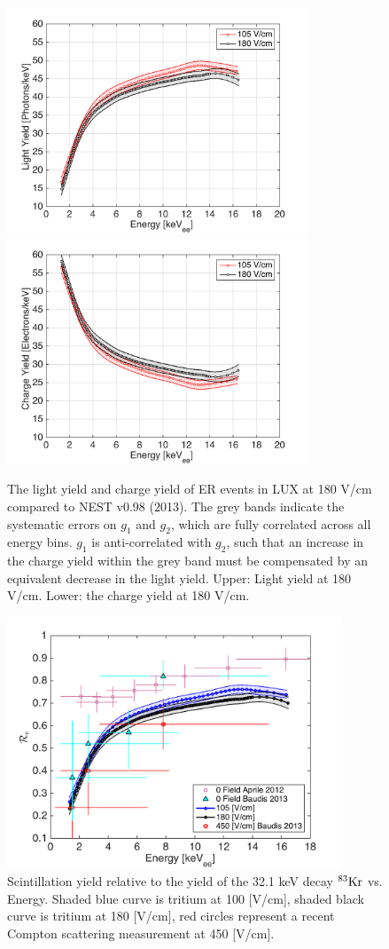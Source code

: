 \begin{figure}[h!]\centering
\includegraphics[width=90mm]{fig/ER_LY.png}
\includegraphics[width=90mm]{fig/ER_QY.png}
\caption{The light yield and charge yield of ER events in LUX at 180 V/cm compared to NEST v0.98 (2013). The grey bands indicate the systematic errors on $g_1$ and $g_2$, which are fully correlated across all energy bins. $g_1$ is anti-correlated with $g_2$, such that an increase in the charge yield within the grey band must be compensated by an equivalent decrease in the light yield. Upper: Light yield at 180 V/cm. Lower: the charge yield at 180 V/cm.}
\label{fig:ER-LY-QY}
\end{figure}

 \begin{figure}[h!]\centering
\includegraphics[width=100mm]{fig/Re_LY.png}
\caption{Scintillation yield relative to the yield of the 32.1 keV decay $\rm^{83}Kr $  vs. Energy. Shaded blue curve is tritium at 100 [V/cm], shaded black curve is tritium at 180 [V/cm], red circles represent a recent Compton scattering measurement at 450 [V/cm]. }
\label{fig:Re_LY}
\end{figure}


